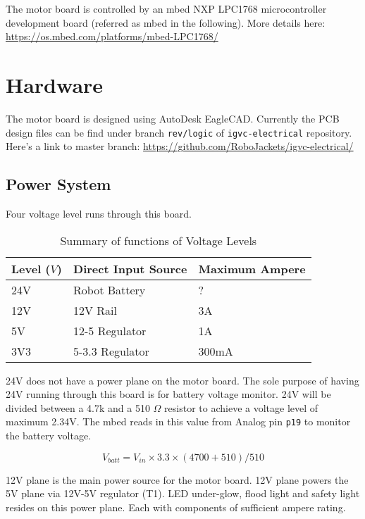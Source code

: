\documentclass[letterpaper, 12pt]{article}
\begin{document}
The motor board is controlled by an mbed NXP LPC1768 microcontroller development board (referred as mbed in the following). More details here: \url{https://os.mbed.com/platforms/mbed-LPC1768/} \vspace{6pt}\\
\pagebreak

\section{Hardware}
The motor board is designed using AutoDesk EagleCAD. Currently the PCB design files can be find under branch \texttt{rev/logic}
of \texttt{igvc-electrical} repository. Here's a link to master branch: \url{https://github.com/RoboJackets/igvc-electrical/}
\subsection{Power System}
Four voltage level runs through this board. 
\begin{table}[h]
    \caption{Summary of functions of Voltage Levels}
    \centering
    \begin{tabular}{p{3cm}p{4cm}p{4cm}}
    \toprule
    Level ($V$)  & Direct Input Source & Maximum Ampere \\
    \midrule
    24V  & Robot Battery & ? \\
    12V  & 12V Rail & 3A  \\
    5V  & 12-5 Regulator & 1A \\
    3V3 & 5-3.3 Regulator & 300mA \\
    \bottomrule
    \end{tabular}
\end{table}

24V does not have a power plane on the motor board. The sole purpose of having 24V running
through this board is for battery voltage monitor. 24V will be divided between a 4.7k and
a 510 $\Omega$ resistor to achieve a voltage level of maximum 2.34V. The mbed reads in this value
from Analog pin \texttt{p19} to monitor the battery voltage. 

\begin{equation}
    V_{batt} = V_{in} \times 3.3 \times (4700 + 510) / 510 
\end{equation}

12V plane is the main power source for the motor board. 12V plane powers the 5V plane via
12V-5V regulator (T1). LED under-glow, flood light and safety light resides on this power
plane. Each with components of sufficient ampere rating. \\
\end{document}
